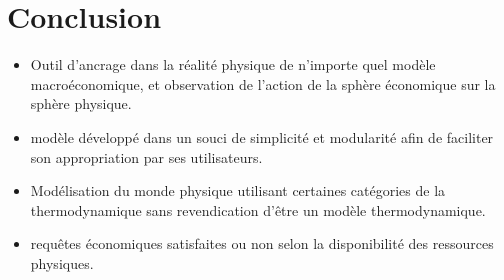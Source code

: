 \documentclass[12pt,a4paper]{article}%
\begin{document}
\section{Conclusion}

\begin{itemize}
\item Outil d'ancrage dans la réalité physique de n'importe quel modèle
macroéconomique, et observation de l'action de la sphère économique sur la
sphère physique.

\item modèle développé dans un souci de simplicité et modularité afin de
faciliter son appropriation par ses utilisateurs.

\item Modélisation du monde physique utilisant certaines catégories de la
thermodynamique sans revendication d'être un modèle thermodynamique.

\item requêtes économiques satisfaites ou non selon la disponibilité des
ressources physiques.
\end{itemize}
\end{document}
